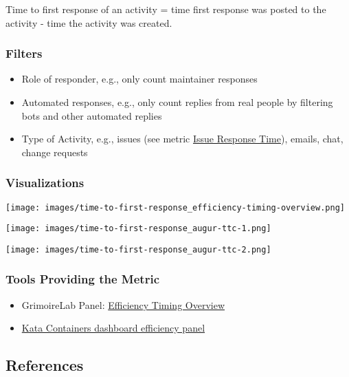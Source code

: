 \documentclass[
  12pt,
]{article}
\providecommand{\tightlist}{%
  \setlength{\itemsep}{0pt}\setlength{\parskip}{0pt}}
\begin{document}
Time to first response of an activity = time first response was posted
to the activity - time the activity was created.

\hypertarget{filters-4}{%
\subsubsection{Filters}\label{filters-4}}

\begin{itemize}
\tightlist
\item
  Role of responder, e.g., only count maintainer responses
\item
  Automated responses, e.g., only count replies from real people by
  filtering bots and other automated replies
\item
  Type of Activity, e.g., issues (see metric
  \href{https://github.com/chaoss/wg-evolution/blob/master/metrics/Issue_Response_Time.md}{Issue
  Response Time}), emails, chat, change requests
\end{itemize}

\hypertarget{visualizations-5}{%
\subsubsection{Visualizations}\label{visualizations-5}}

\texttt{[image: images/time-to-first-response\_efficiency-timing-overview.png]}

\texttt{[image: images/time-to-first-response\_augur-ttc-1.png]}

\texttt{[image: images/time-to-first-response\_augur-ttc-2.png]}

\hypertarget{tools-providing-the-metric-4}{%
\subsubsection{Tools Providing the
Metric}\label{tools-providing-the-metric-4}}

\begin{itemize}
\tightlist
\item
  GrimoireLab Panel:
  \href{https://chaoss.github.io/grimoirelab-sigils/panels/efficiency-timing-overview/}{Efficiency
  Timing Overview}
\item
  \href{https://katacontainers.biterg.io/app/kibana\#/dashboard/cbbdd920-288c-11e9-b662-975152e57997}{Kata
  Containers dashboard efficiency panel}
\end{itemize}

\hypertarget{references-6}{%
\subsection{References}\label{references-6}}
\end{document}
